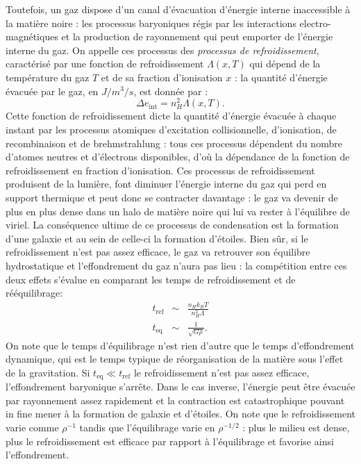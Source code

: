 Toutefois, un gaz dispose d'un canal d'évacuation d'énergie interne inaccessible à la matière noire : les processus baryoniques régis par les interactions electro-magnétiques et la production de rayonnement qui peut emporter de l'énergie interne du gaz. On appelle ces processus des \textit{processus de refroidissement}, caractérisé par une fonction de refroidissement $\Lambda(x,T)$ qui dépend de la température du gaz $T$ et de sa fraction d'ionisation $x$ : la quantité d'énergie évacuée par le gaz, en $J/m^3/s$, est donnée par :
\begin{equation}
\Delta e_\mathrm{int}=n_H^2 \Lambda(x,T).
\end{equation}
Cette fonction de refroidissement dicte la quantité d'énergie évacuée à chaque instant par les processus atomiques d'excitation collisionnelle, d'ionisation, de recombinaison et de brehmstrahlung : tous ces processus dépendent du nombre d'atomes neutres et d'électrons disponibles, d'où la dépendance de la fonction de refroidissement en fraction d'ionisation. Ces processus de refroidissement produisent de la lumière, font diminuer l'énergie interne du gaz qui perd en support thermique et peut donc se contracter davantage : le gaz va devenir de plus en plus dense dans un halo de matière noire qui lui va rester à l'équilibre de viriel. La conséquence ultime de ce processus de condensation est la formation d'une galaxie et au sein de celle-ci la formation d'étoiles. Bien sûr, si le refroidissement n'est pas assez efficace, le gaz va retrouver son équilibre hydrostatique et l'effondrement du gaz n'aura pas lieu : la compétition entre ces deux effets s'évalue en comparant les temps de refroidissement et de rééquilibrage:
\begin{eqnarray}
t_\mathrm{ref}&\sim &\frac{n_H k_BT}{n_H^2\Lambda}\\
t_\mathrm{eq}&\sim &\frac{1}{\sqrt{G\rho}}.
\end{eqnarray}
On note que le temps d'équilibrage n'est rien d'autre que le temps d'effondrement dynamique, qui est le temps typique de réorganisation de la matière sous l'effet de la gravitation. Si $t_\mathrm{eq}\ll t_\mathrm{ref}$ le refroidissement n'est pas assez efficace, l'effondrement baryonique s'arrête. Dans le cas inverse, l'énergie peut être évacuée par rayonnement assez rapidement et la contraction est catastrophique pouvant in fine mener à la formation de galaxie et d'étoiles. On note que le refroidissement varie comme $\rho^{-1}$ tandis que l'équilibrage varie en $\rho^{-1/2}$ : plus le milieu est dense, plus le refroidissement est efficace par rapport à l'équilibrage et favorise ainsi l'effondrement. 

